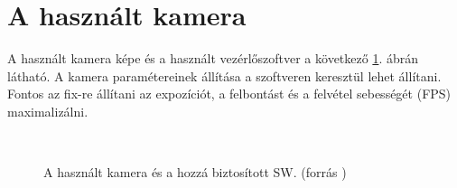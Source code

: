 	\newpage



\section{A használt kamera}
	
	A használt kamera képe és a használt vezérlőszoftver a következő \ref{fig:cam}. ábrán látható.
	A kamera paramétereinek állítása a szoftveren keresztül lehet állítani. Fontos az fix-re állítani az expozíciót, a felbontást
	és a felvétel sebességét (FPS) maximalizálni. 

\begin{figure}[htp]
\centering
	\\
	\caption[A használt kamera és a hozzá biztosított SW.]{A használt kamera és a hozzá biztosított SW.
	(forrás \cite{gx1050})}
	\label{fig:cam}
\end{figure}

